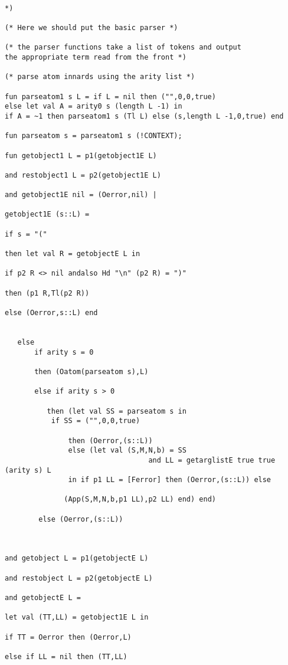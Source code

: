 \documentclass[12pt]{article}
\begin{document}
\begin{verbatim}

*)

(* Here we should put the basic parser *)

(* the parser functions take a list of tokens and output
the appropriate term read from the front *)

(* parse atom innards using the arity list *)

fun parseatom1 s L = if L = nil then ("",0,0,true)
else let val A = arity0 s (length L -1) in 
if A = ~1 then parseatom1 s (Tl L) else (s,length L -1,0,true) end

fun parseatom s = parseatom1 s (!CONTEXT);

fun getobject1 L = p1(getobject1E L) 

and restobject1 L = p2(getobject1E L)

and getobject1E nil = (Oerror,nil) |

getobject1E (s::L) =

if s = "(" 

then let val R = getobjectE L in 

if p2 R <> nil andalso Hd "\n" (p2 R) = ")"

then (p1 R,Tl(p2 R))

else (Oerror,s::L) end


   else 
       if arity s = 0 
	
	   then (Oatom(parseatom s),L)

       else if arity s > 0 
	
	      then (let val SS = parseatom s in 
           if SS = ("",0,0,true)
		   
		       then (Oerror,(s::L)) 
			   else (let val (S,M,N,b) = SS
                                  and LL = getarglistE true true (arity s) L
               in if p1 LL = [Ferror] then (Oerror,(s::L)) else

              (App(S,M,N,b,p1 LL),p2 LL) end) end)
			   
        else (Oerror,(s::L))
		

		
and getobject L = p1(getobjectE L)

and restobject L = p2(getobjectE L)
		
and getobjectE L =

let val (TT,LL) = getobject1E L in

if TT = Oerror then (Oerror,L)

else if LL = nil then (TT,LL)


\end{verbatim}
\end{document}
